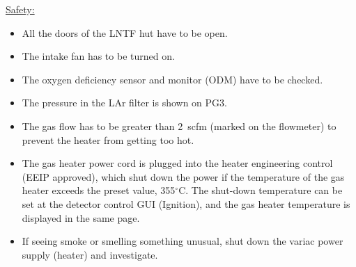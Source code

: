 \documentclass[letterpaper,11pt]{article}
\newcommand{\dC}        {$^\circ$C}
\begin{document}
\underline{Safety:}
\begin{itemize}
\setlength\itemsep{-0.2em}
\item All the doors of the LNTF hut have to be open.
\item The intake fan has to be turned on.
\item The oxygen deficiency sensor and monitor (ODM) have to be checked.
\item The pressure in the LAr filter is shown on PG3.
\item The gas flow has to be greater than 2~scfm (marked on the flowmeter) to prevent the heater from getting too hot.
\item The gas heater power cord is plugged into the heater engineering control (EEIP approved), which shut down the power if the temperature
of the gas heater exceeds the preset value, 355{\dC}.  
The shut-down temperature can be set at the detector control GUI (Ignition),
and the gas heater temperature is displayed in the same page.
\item If seeing smoke or smelling something unusual, shut down the variac power supply (heater) and investigate.
\end{itemize}
\end{document}
